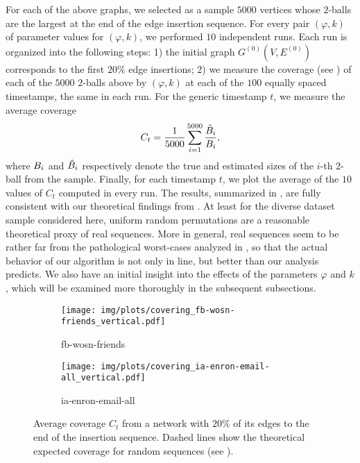 For each of the above graphs, we selected as a sample $5000$ vertices whose $2$-balls are the largest at the end of the edge insertion sequence. For every pair $(\varphi, k)$ of parameter values for \lazyscheme$(\varphi,k)$, we performed $10$ independent runs. Each run is organized into the following steps: 1) the initial graph $G^{(0)}(V,E^{(0)})$ corresponds to the first $20\%$ edge insertions; 2) we measure the coverage (see ) of each of the $5000$ $2$-balls above by \lazyscheme$(\varphi,k)$ at each of the $100$ equally spaced timestamps, the same in each run. For the generic timestamp $t$, we measure the average coverage
\[
    C_t = \frac{1}{5000}\sum_{i=1}^{5000}\frac{\hat{B}_i}{B_i},
\]
where $B_i$ and $\hat{B}_i$ respectively denote the true and estimated sizes of the $i$-th $2$-ball from the sample. Finally, for each timestamp $t$, we plot the average of the $10$ values of $C_t$ computed in every run. 
The results, summarized in , are fully consistent with our theoretical findings from . 
At least for the diverse dataset sample considered here, uniform random permutations are a reasonable theoretical proxy of real sequences. More in general, real sequences seem to be rather far from the pathological worst-cases analyzed in , so that the actual behavior of our algorithm is not only in line, but better than our analysis predicts.
We also have an initial insight into the effects of the parameters $\varphi$ and $k$, which will be examined more thoroughly in the subsequent subsections.

\begin{figure}
    \centering  
    \begin{subfigure}{\linewidth}
        \centering
        \texttt{[image: img/plots/covering\_fb-wosn-friends\_vertical.pdf]}
        \caption{fb-wosn-friends}
        \label{fig:covering_fb}
    \end{subfigure}
    \hfill %
    \begin{subfigure}{\linewidth}
        \centering
        \texttt{[image: img/plots/covering\_ia-enron-email-all\_vertical.pdf]}
        \caption{ia-enron-email-all}
        \label{fig:covering_enron}
    \end{subfigure}
    \caption{Average coverage $C_t$ from a network with $20\%$ of its edges to the end of the insertion sequence. Dashed lines show the theoretical expected coverage for random sequences (see ).}
    \label{fig:covering}
\end{figure}


